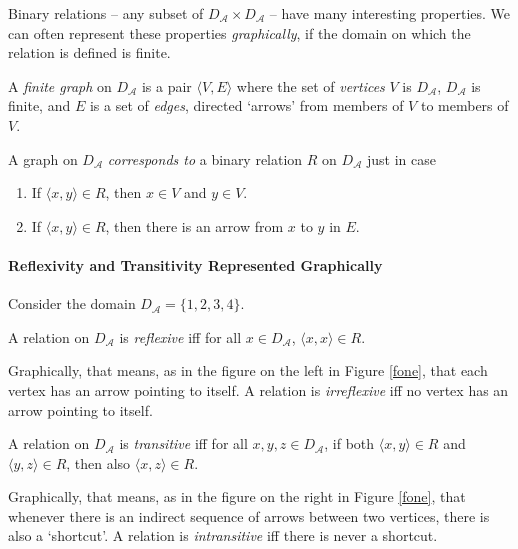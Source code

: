 Binary relations – any subset of $D_{\mathscr{A}}\times D_{\mathscr{A}}$ – have many interesting properties. We can often represent these properties \emph{graphically}, if the domain on which the relation is defined is finite.

\begin{definition}
	A \emph{finite graph} on $D_{\mathscr{A}}$ is a pair $\langle V, E\rangle$ where the set of \emph{vertices} $V$ is $D_{\mathscr{A}}$, $D_{\mathscr{A}}$ is finite, and $E$ is a set of \emph{edges}, directed `arrows' from members of $V$ to members of $V$.
\end{definition} A graph on $D_{\mathscr{A}}$ \emph{corresponds to} a binary relation $R$ on $D_{\mathscr{A}}$ just in case \begin{enumerate}
	\item If $\langle x,y\rangle \in R$, then $x\in V$ and $y \in V$.
	\item If $\langle x,y\rangle \in R$, then there is an arrow from $x$ to $y$ in $E$.
\end{enumerate}

\paragraph{Reflexivity and Transitivity Represented Graphically}

Consider the domain $D_{\mathscr{A}}=\{1,2,3,4\}$.

\begin{definition}[Reflexive]
	A relation on $D_{\mathscr{A}}$ is \emph{reflexive} iff for all $x\in D_{\mathscr{A}}$, $\langle x,x\rangle\in R$. 
\end{definition}Graphically, that means, as in the figure on the left in Figure \ref{fone}, that each vertex has an arrow pointing to itself. A relation is \emph{irreflexive} iff no vertex has an arrow pointing to itself.

\begin{definition}[Transitive]
	A relation on $D_{\mathscr{A}}$ is \emph{transitive} iff for all $x,y,z\in D_{\mathscr{A}}$, if both $\langle x,y\rangle\in R$ and $\langle y,z\rangle\in R$, then also $\langle x,z\rangle\in R$.
\end{definition} Graphically, that means, as in the figure on the right in Figure \ref{fone}, that whenever there is an indirect sequence of arrows between two vertices, there is also a `shortcut'. A relation is \emph{intransitive} iff there is never a shortcut.

